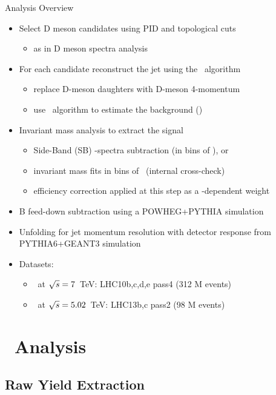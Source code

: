 \documentclass[xcolor={usenames,dvipsnames}]{beamer}
\begin{document}
\begin{frame}{Analysis Overview}
\begin{itemize}
\item \alert{Select D meson candidates using PID and topological cuts}
\begin{itemize}
\item as in D meson spectra analysis
\end{itemize}
\item \alert{For each candidate reconstruct the jet using the \antikt\ algorithm}
\begin{itemize}
\item replace D-meson daughters with D-meson 4-momentum
\item use \kt\ algorithm to estimate the background (\pPb)
\end{itemize}
\item Invariant mass analysis to extract the signal
\begin{itemize}
\item \alert{Side-Band (SB) \ptjet-spectra subtraction (in bins of \ptd)}, or
\item invariant mass fits in bins of \ptjet\ (internal cross-check)
\item efficiency correction applied at this step as a \ptd-dependent weight
\end{itemize}
\item \alert{B feed-down subtraction} using a POWHEG+PYTHIA simulation
\item \alert{Unfolding for jet momentum resolution} with detector response from PYTHIA6+GEANT3 simulation
\item Datasets:
\begin{itemize}
\item \pp\ at $\sqrt{s}=7$~TeV: LHC10b,c,d,e pass4 (312 M events)
\item \pPb\ at $\sqrt{s}=5.02$~TeV: LHC13b,c pass2 (98 M events)
\end{itemize}
\end{itemize}
\end{frame}

\section{\pp\ Analysis}

\subsection{Raw Yield Extraction}
\end{document}
